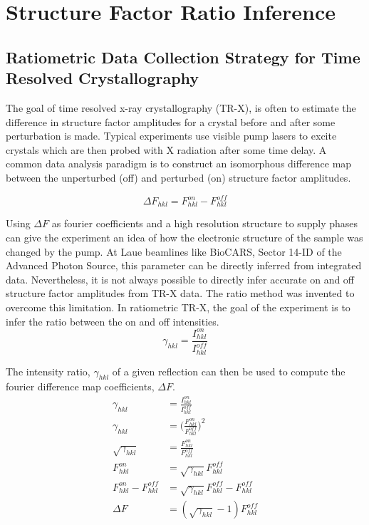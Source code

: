 \documentclass{report}
\begin{document}
\chapter{Structure Factor Ratio Inference}
\section{Ratiometric Data Collection Strategy for Time Resolved Crystallography}
The goal of time resolved x-ray crystallography (TR-X), is often to estimate the difference in structure factor amplitudes for a crystal before and after some perturbation is made. 
Typical experiments use visible pump lasers to excite crystals which are then probed with X radiation after some time delay. 
A common data analysis paradigm is to construct an isomorphous difference map between the unperturbed (off) and perturbed (on) structure factor amplitudes. 

\begin{equation}
\Delta F_{hkl} = F^{on}_{hkl} - F^{off}_{hkl}
\end{equation}

Using $\Delta F$ as fourier coefficients and a high resolution structure to supply phases can give the experiment an idea of how the electronic structure of the sample was changed by the pump. 
At Laue beamlines like BioCARS, Sector 14-ID of the Advanced Photon Source, this parameter can be directly inferred from integrated data. 
Nevertheless, it is not always possible to directly infer accurate on and off structure factor amplitudes from TR-X data. 
The ratio method was invented to overcome this limitation. 
In ratiometric TR-X, the goal of the experiment is to infer the ratio between the on and off intensities. 
\begin{equation} \label{eq:gamma}
\gamma_{hkl} = \frac{I^{on}_{hkl}}{I^{off}_{hkl}}
\end{equation}

The intensity ratio, $\gamma_{hkl}$ of a given reflection can then be used to compute the fourier difference map coefficients, $\Delta F$. 
\begin{align}
\gamma_{hkl} &= \frac{I^{on}_{hkl}}{I^{off}_{hkl}} \nonumber \\
\gamma_{hkl} &= \bigg( \frac{F^{on}_{hkl}}{F^{off}_{hkl}} \bigg) ^2 \nonumber \\
\sqrt{\gamma_{hkl}} &= \frac{F^{on}_{hkl}}{F^{off}_{hkl}} \nonumber \\
F^{on}_{hkl} &= \sqrt{\gamma_{hkl}} F^{off}_{hkl}  \nonumber \\
F^{on}_{hkl} - F^{off}_{hkl} &= \sqrt{\gamma_{hkl}} F^{off}_{hkl} - F^{off}_{hkl} \nonumber \\
\Delta F &= (\sqrt{\gamma_{hkl}} - 1 ) F^{off}_{hkl} 
\end{align}
\end{document}
